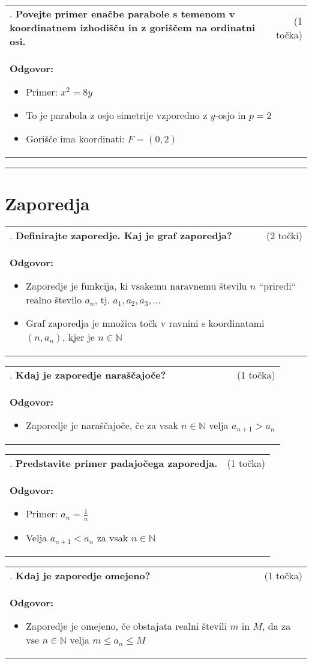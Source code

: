 \documentclass[12pt]{article}
\newcounter{vprasanje}[section]
\renewcommand{\thevprasanje}{\roman{vprasanje}}
\newcommand{\vprasanje}[2]{%
  \stepcounter{vprasanje}%
  \textbf{\thevprasanje}. \textbf{#1} & (#2) \\
}
\newcommand{\odgovor}[1]{%
  \multicolumn{2}{p{\dimexpr\textwidth-2\tabcolsep\relax}}{%
    \small \textbf{Odgovor:} #1%
  } \\[1em]%
}
\newcommand{\crta}{\rule{\textwidth}{0.4pt}}
\newcommand{\naslov}[1]{%
  \vspace{1em} 
  \section{#1}
  \addcontentsline{toc}{section}{\protect\numberline{}#1}%
}
\newcommand{\razmak}[1]{%
  \vspace{#1}
}
\begin{document}
\begin{tabularx}{\textwidth}{X r}
\vprasanje{Povejte primer enačbe parabole s temenom v koordinatnem izhodišču in z goriščem na ordinatni osi.}{1 točka}
\odgovor{
\begin{itemize}
  \item Primer: $x^2 = 8y$
  \item To je parabola z osjo simetrije vzporedno z $y$-osjo in $p = 2$
  \item Gorišče ima koordinati: $F = (0, 2)$
\end{itemize}
}
\end{tabularx}

\razmak{0.5em}


\crta

\naslov{Zaporedja}

\begin{tabularx}{\textwidth}{X r}
\vprasanje{Definirajte zaporedje. Kaj je graf zaporedja?}{2 točki}
\odgovor{
\begin{itemize}
  \item Zaporedje je funkcija, ki vsakemu naravnemu številu $n$ ``priredi`` realno število $a_n$, tj. $a_1, a_2, a_3, \ldots$
  \item Graf zaporedja je množica točk v ravnini s koordinatami $(n, a_n)$, kjer je $n \in \mathbb{N}$
\end{itemize}
}
\end{tabularx}

\begin{tabularx}{\textwidth}{X r}
\vprasanje{Kdaj je zaporedje naraščajoče?}{1 točka}
\odgovor{
\begin{itemize}
  \item Zaporedje je naraščajoče, če za vsak $n \in \mathbb{N}$ velja $a_{n+1} > a_n$
\end{itemize}
}
\end{tabularx}

\begin{tabularx}{\textwidth}{X r}
\vprasanje{Predstavite primer padajočega zaporedja.}{1 točka}
\odgovor{
\begin{itemize}
  \item Primer: $a_n = \frac{1}{n}$
  \item Velja $a_{n+1} < a_n$ za vsak $n \in \mathbb{N}$
\end{itemize}
}
\end{tabularx}

\begin{tabularx}{\textwidth}{X r}
\vprasanje{Kdaj je zaporedje omejeno?}{1 točka}
\odgovor{
\begin{itemize}
  \item Zaporedje je omejeno, če obstajata realni števili $m$ in $M$, da za vse $n \in \mathbb{N}$ velja $m \leq a_n \leq M$
\end{itemize}
}
\end{tabularx}
\end{document}
